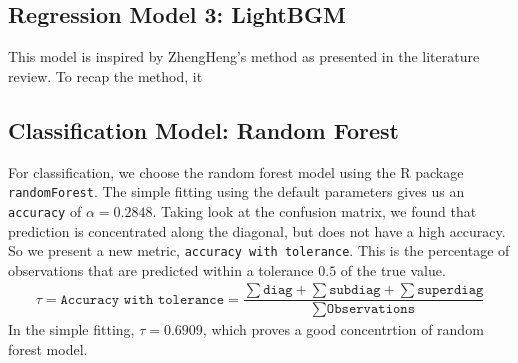 \documentclass[8pt]{article}
\begin{document}
\subsection{Regression Model 3: LightBGM}
This model is inspired by ZhengHeng's method as presented in the literature review.
To recap the method, it 

\subsection{Classification Model: Random Forest}
For classification, we choose the random forest model using the R package \texttt{randomForest}.
The simple fitting using the default parameters gives us an \texttt{accuracy} of $\alpha = 0.2848$. 
Taking look at the confusion matrix, we found that prediction is concentrated along the diagonal, 
but does not have a high accuracy. So we present a new metric, \texttt{accuracy with tolerance}. 
This is the percentage of observations that are predicted within a tolerance $0.5$ of the true value.
\begin{align*}
    \tau = \texttt{Accuracy with tolerance} = \dfrac{\sum \texttt{diag} + \sum \texttt{subdiag} + \sum \texttt{superdiag}}{\sum \texttt{Observations}}
\end{align*}
In the simple fitting, $\tau = 0.6909$, which proves a good concentrtion of random forest model. 
\end{document}
